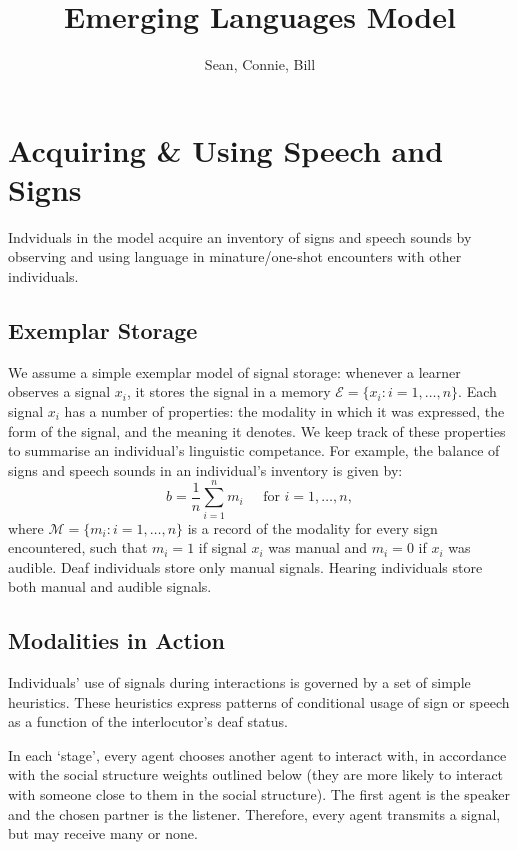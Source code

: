 \documentclass[11pt, oneside]{article}
\title{Emerging Languages Model}
\author{Sean, Connie, Bill}
\begin{document}
\maketitle

\section{Acquiring \& Using Speech and Signs} %
\label{sec:Acq}
Indviduals in the model acquire an inventory of signs and speech sounds by observing and using language in minature/one-shot encounters with other individuals.

\subsection{Exemplar Storage} %
\label{sub:exemplar_storage}
We assume a simple exemplar model of signal storage: whenever a learner observes a signal $x_i$, it stores the signal in a memory $\mathcal{E} = \{x_i\colon i = 1,\ldots,n\}$. Each signal $x_i$ has a number of properties: the modality in which it was expressed, the form of the signal, and the meaning it denotes. We keep track of these properties to summarise an individual's linguistic competance. For example, the balance of signs and speech sounds in an individual's inventory is given by:
\begin{equation}
	b = \frac{1}{n}\sum_{i=1}^n m_i \;\;\;\;\; \mbox{for } i= 1,\ldots,n,
\end{equation}
where $\mathcal{M} = \{m_i\colon i =1,\ldots,n\}$ is a record of the modality for every sign encountered, such that $m_i = 1$ if signal $x_i$ was manual and $m_i = 0$ if $x_i$ was audible. Deaf individuals store only manual signals. Hearing individuals store both manual and audible signals.

\subsection{Modalities in Action} %
\label{sub:modalities_in_action}
Individuals' use of signals during interactions is governed by a set of simple heuristics. These heuristics express patterns of conditional usage of sign or speech as a function of the interlocutor's deaf status. 

In each `stage', every agent chooses another agent to interact with, in accordance with the social structure weights outlined below (they are more likely to interact with someone close to them in the social structure). The first agent is the speaker and the chosen partner is the listener.  Therefore, every agent transmits a signal, but may receive many or none.
\end{document}
